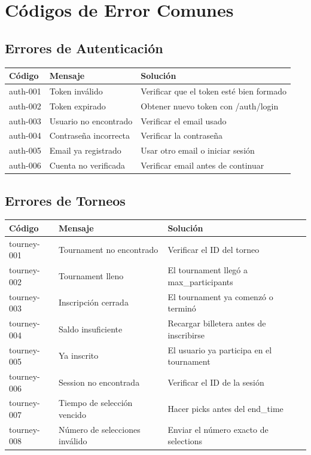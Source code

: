 \documentclass[12pt,a4paper]{article}
\begin{document}
\newpage

\section{Códigos de Error Comunes}

\subsection{Errores de Autenticación}
\begin{tabular}{|l|l|p{8cm}|}
\hline
\textbf{Código} & \textbf{Mensaje} & \textbf{Solución} \\
\hline
auth-001 & Token inválido & Verificar que el token esté bien formado \\
auth-002 & Token expirado & Obtener nuevo token con /auth/login \\
auth-003 & Usuario no encontrado & Verificar el email usado \\
auth-004 & Contraseña incorrecta & Verificar la contraseña \\
auth-005 & Email ya registrado & Usar otro email o iniciar sesión \\
auth-006 & Cuenta no verificada & Verificar email antes de continuar \\
\end{tabular}

\subsection{Errores de Torneos}
\begin{tabular}{|l|l|p{8cm}|}
\hline
\textbf{Código} & \textbf{Mensaje} & \textbf{Solución} \\
\hline
tourney-001 & Tournament no encontrado & Verificar el ID del torneo \\
tourney-002 & Tournament lleno & El tournament llegó a max\_participants \\
tourney-003 & Inscripción cerrada & El tournament ya comenzó o terminó \\
tourney-004 & Saldo insuficiente & Recargar billetera antes de inscribirse \\
tourney-005 & Ya inscrito & El usuario ya participa en el tournament \\
tourney-006 & Session no encontrada & Verificar el ID de la sesión \\
tourney-007 & Tiempo de selección vencido & Hacer picks antes del end\_time \\
tourney-008 & Número de selecciones inválido & Enviar el número exacto de selections \\
\end{tabular}
\end{document}
